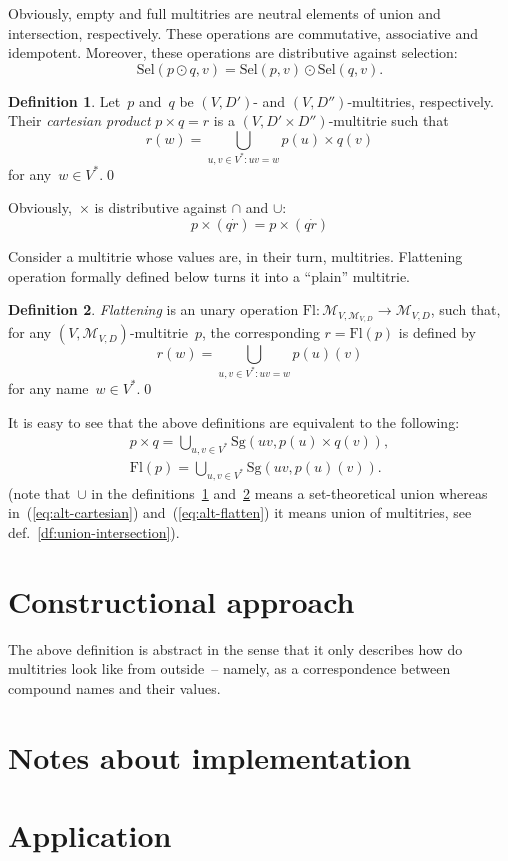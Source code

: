 \documentclass{article}
\theoremstyle{definition}
\newtheorem{Df}{Definition}
\newcommand{\setcharmt}{M}
\newcommand{\setsymbol}[3]{\mathcal{#1}_{#2,#3}}
\newcommand{\setmt}[2]{\setsymbol{\setcharmt}{#1}{#2}}
\newcommand{\flatten}{\mathrm{Fl}}
\newcommand{\select}{\mathrm{Sel}}
\newcommand{\singleleaf}{\mathrm{Sg}}
\begin{document}
Obviously, empty and full multitries are neutral elements of union and intersection,
respectively. These operations are commutative, associative and idempotent.
Moreover, these operations are distributive against selection:
\[
  \select(p\odot q, v) = \select(p, v) \odot \select(q, v) .
\]

\begin{Df}\label{df:cartesian}
Let~$p$ and~$q$ be $(V,D')$- and $(V,D'')$-multitries, respectively. Their
\emph{cartesian product} $p\times q = r$ is a $(V,D'\times D'')$-multitrie
such that
\[
  r(w) = \bigcup_{u,v\in V^\ast: uv = w} p(u) \times q(v)
\]
for any~$w\in V^\ast$.\qed
\end{Df}

Obviously,~$\times$ is distributive against $\cap$ and $\cup$:
\[
  p\times(q\dot r) = p\times(q\dot r)
\]

Consider a multitrie whose values are, in their turn, multitries.
Flattening operation formally defined below turns it into a ``plain'' multitrie.
\begin{Df}\label{df:flatten}
\emph{Flattening} is an unary operation $\flatten : \setmt{V}{\setmt{V}{D}}
\to\setmt{V}{D}$, such that, for any $(V,\setmt{V}{D})$-multitrie~$p$, the
corresponding $r=\flatten(p)$ is defined by
\[
  r(w) = \bigcup_{u,v\in V^\ast: uv = w} p(u)(v)
\]
for any name~$w\in V^\ast$.\qed
\end{Df}

It is easy to see that the above definitions are equivalent to the following:
\begin{eqnarray}
  \label{eq:alt-cartesian}
  p\times q =
    \bigcup_{u,v\in V^\ast} \singleleaf(uv, p(u) \times q(v)) ,\\
  \label{eq:alt-flatten}
  \flatten(p) =
    \bigcup_{u,v\in V^\ast} \singleleaf(uv, p(u)(v)) .
\end{eqnarray}
(note that~$\cup$ in the definitions~\ref{df:cartesian} and~\ref{df:flatten}
means a set-theoretical union whereas in~(\ref{eq:alt-cartesian})
and~(\ref{eq:alt-flatten}) it means union of multitries, see
def.~\ref{df:union-intersection}).

\section{Constructional approach}

The above definition is abstract in the sense that it only describes how do
multitries look like from outside~-- namely, as a correspondence between
compound names and their values.

\section{Notes about implementation}

\section{Application}
\end{document}
